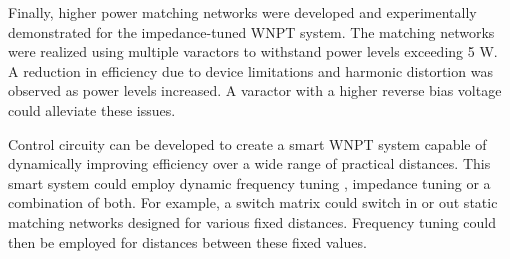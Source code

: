 \documentclass[journal]{IEEEtran}
\begin{document}
Finally, higher power matching networks were developed and experimentally demonstrated for the impedance-tuned WNPT system. The matching networks were realized using multiple varactors to withstand power levels exceeding 5 W. A reduction in efficiency due to device limitations and harmonic distortion was observed as power levels increased. A varactor with a higher reverse bias voltage could alleviate these issues.

Control circuity can be developed to create a smart WNPT system capable of dynamically improving efficiency over a wide range of practical distances. This smart system could employ dynamic frequency tuning \cite{Auto-Tune}, impedance tuning or a combination of both. For example, a switch matrix could switch in or out static matching networks designed for various fixed distances. Frequency tuning could then be employed for distances between these fixed values.


\end{document}
